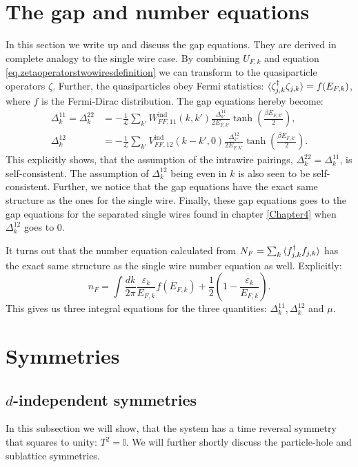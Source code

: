 \section{The gap and number equations}
\label{sec.2wiresgapandnumberequations}
In this section we write up and discuss the gap equations. They are derived in complete analogy to the single wire case. By combining $U_{F,k}$ and equation \ref{eq.zetaoperatorstwowiresdefinition} we can transform to the quasiparticle operators $\zeta$. Further, the quasiparticles obey Fermi statistics: $\braket{\zeta^\dagger_{j,k}\zeta_{j, k}} = f(E_{F,k})$, where $f$ is the Fermi-Dirac distribution. The gap equations hereby become:
\begin{align}
\Delta^{11}_k = \Delta^{22}_k &= -\frac{1}{\mathcal{L}}\sum_{k'} W^\text{ind}_{FF,11}(k,k')\frac{\Delta^{11}_{k'}}{2E_{F,k'}}\tanh\left(\frac{\beta E_{F,k'}}{2}\right), \nonumber \\
\Delta^{12}_k &= -\frac{1}{\mathcal{L}}\sum_{k'} V^\text{ind}_{FF,12}(k - k',0)\frac{\Delta^{12}_{k'}}{2E_{F,k'}}\tanh\left(\frac{\beta E_{F,k'}}{2}\right).
\label{eq.2wiresgapequations}
\end{align}
This explicitly shows, that the assumption of the intrawire pairings, $\Delta^{22}_k = \Delta^{11}_k$, is self-consistent. The assumption of $\Delta^{12}_k$ being even in $k$ is also seen to be self-consistent. Further, we notice that the gap equations have the exact same structure as the ones for the single wire. Finally, these gap equations goes to the gap equations for the separated single wires found in chapter \ref{Chapter4} when $\Delta^{12}_k$ goes to $0$.  

It turns out that the number equation calculated from $N_F = \sum_k \braket{f^\dagger_{j,k}f_{j,k}}$ has the exact same structure as the single wire number equation as well. Explicitly: 
\begin{equation}
n_F = \int \frac{dk}{2\pi} \frac{\varepsilon_k}{E_{F,k}}f(E_{F,k}) + \frac{1}{2}\left(1 - \frac{\varepsilon_k}{E_{F,k}}\right). 
\label{eq.numberequationtwowires}
\end{equation}
This gives us three integral equations for the three quantities: $\Delta^{11}_k, \Delta^{12}_k$ and $\mu$.

\section{Symmetries}
\label{sec.2wiressymmetries}

\subsection{$d$-independent symmetries}
In this subsection we will show, that the system has a time reversal symmetry that squares to unity: $T^2 = \mathbb{I}$. We will further shortly discuss the particle-hole and sublattice symmetries. 

